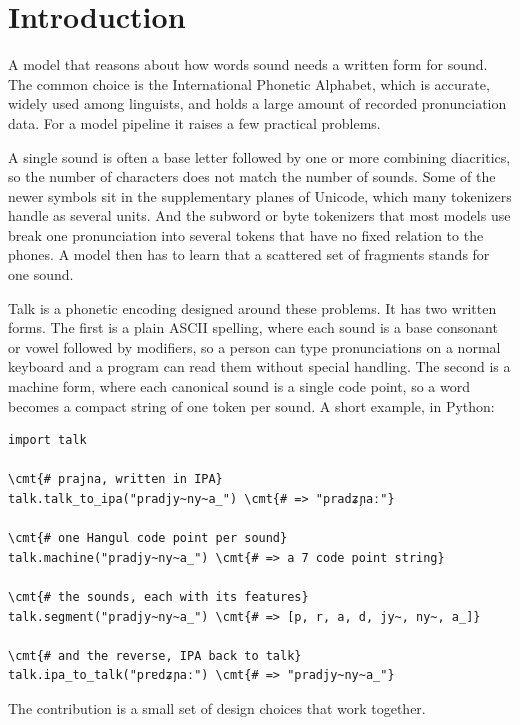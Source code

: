 \section{Introduction}

A model that reasons about how words sound needs a written form for sound. The common choice is the International Phonetic Alphabet, which is accurate, widely used among linguists, and holds a large amount of recorded pronunciation data. For a model pipeline it raises a few practical problems.

A single sound is often a base letter followed by one or more combining diacritics, so the number of characters does not match the number of sounds. Some of the newer symbols sit in the supplementary planes of Unicode, which many tokenizers handle as several units. And the subword or byte tokenizers that most models use break one pronunciation into several tokens that have no fixed relation to the phones. A model then has to learn that a scattered set of fragments stands for one sound.

Talk is a phonetic encoding designed around these problems. It has two written forms. The first is a plain ASCII spelling, where each sound is a base consonant or vowel followed by modifiers, so a person can type pronunciations on a normal keyboard and a program can read them without special handling. The second is a machine form, where each canonical sound is a single code point, so a word becomes a compact string of one token per sound. A short example, in Python:

\begin{Verbatim}[commandchars=\\\{\},fontsize=\small]
import talk

\cmt{# prajna, written in IPA}
talk.talk_to_ipa("pradjy~ny~a_") \cmt{# => "pradʑɲaː"}

\cmt{# one Hangul code point per sound}
talk.machine("pradjy~ny~a_") \cmt{# => a 7 code point string}

\cmt{# the sounds, each with its features}
talk.segment("pradjy~ny~a_") \cmt{# => [p, r, a, d, jy~, ny~, a_]}

\cmt{# and the reverse, IPA back to talk}
talk.ipa_to_talk("prɐdʑɲaː") \cmt{# => "pradjy~ny~a_"}
\end{Verbatim}

The contribution is a small set of design choices that work together.

